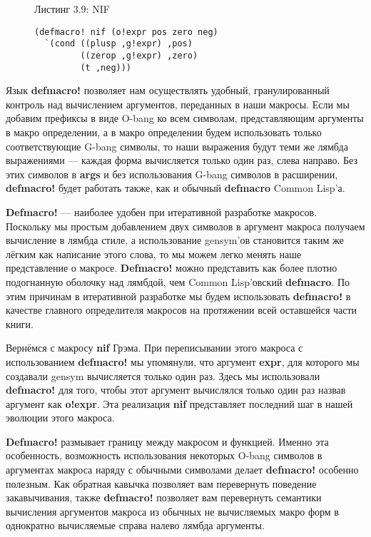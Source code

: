 \begin{figure}Листинг 3.9: NIF\label{listing_3.9}
\listbegin
\begin{verbatim}
(defmacro! nif (o!expr pos zero neg)
  `(cond ((plusp ,g!expr) ,pos)
         ((zerop ,g!expr) ,zero)
         (t ,neg)))
\end{verbatim}
\listend
\end{figure}

Язык \textbf{defmacro!} позволяет нам осуществлять удобный, гранулированный контроль над вычислением аргументов, переданных в наши макросы. Если мы добавим префиксы в виде O-bang ко всем символам, представляющим аргументы в макро определении, а в макро определении будем использовать только соответствующие G-bang символы, то наши выражения будут теми же лямбда выражениями --- каждая форма вычисляется только один раз, слева направо. Без этих символов в \textbf{args} и без использования G-bang символов в расширении, \textbf{defmacro!} будет работать также, как и обычный \textbf{defmacro} Common Lisp'а.

\textbf{Defmacro!} --- наиболее удобен при итеративной разработке макросов. Поскольку мы простым добавлением двух символов в аргумент макроса получаем вычисление в лямбда стиле, а использование gensym'ов становится таким же лёгким как написание этого слова, то мы можем легко менять наше представление о макросе. \textbf{Defmacro!} можно представить как более плотно подогнанную оболочку над лямбдой, чем Common Lisp'овский \textbf{defmacro}. По этим причинам в итеративной разработке мы будем использовать \textbf{defmacro!} в качестве главного определителя макросов на протяжении всей оставшейся части книги.

Вернёмся с макросу \textbf{nif} Грэма. При переписывании этого макроса с использованием \textbf{defmacro!} мы упомянули, что аргумент \textbf{expr}, для которого мы создавали gensym вычисляется только один раз. Здесь мы использовали \textbf{defmacro!} для того, чтобы этот аргумент вычислялся только один раз назвав аргумент как \textbf{o!expr}. Эта реализация \textbf{nif} представляет последний шаг в нашей эволюции этого макроса.

\textbf{Defmacro!} размывает границу между макросом и функцией. Именно эта особенность, возможность использования некоторых O-bang символов в аргументах макроса наряду с обычными символами делает {\textbf{defmacro!}} особенно полезным. Как обратная кавычка позволяет вам перевернуть поведение закавычивания, также \textbf{defmacro!} позволяет вам перевернуть семантики вычисления аргументов макроса из обычных не вычисляемых макро форм в однократно вычисляемые справа налево лямбда аргументы.

